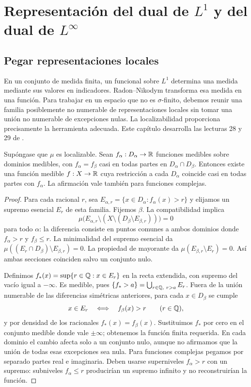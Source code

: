 \chapter{Representación del dual de \texorpdfstring{$L^1$}{L1} y del dual de \texorpdfstring{$L^\infty$}{L infinito}}\label{v2:cap14}\label{cap:v2-14}
\section{Pegar representaciones locales}\label{lectura:v2-28}
En un conjunto de medida finita, un funcional sobre $L^1$ determina una medida mediante sus valores en indicadores. Radon--Nikodym transforma esa medida en una función. Para trabajar en un espacio que no es $\sigma$-finito, debemos reunir una familia posiblemente no numerable de representaciones locales sin tomar una unión no numerable de excepciones nulas. La localizabilidad proporciona precisamente la herramienta adecuada. Este capítulo desarrolla las lecturas 28 y 29 de \cite{valencia2}.
\begin{lema}\label{v2:pegado-medible}
Supóngase que $\mu$ es localizable. Sean $f_\alpha:D_\alpha\to\mathbb R$ funciones medibles sobre dominios medibles, con $f_\alpha=f_\beta$ casi en todas partes en $D_\alpha\cap D_\beta$. Entonces existe una función medible $f:X\to\mathbb R$ cuya restricción a cada $D_\alpha$ coincide casi en todas partes con $f_\alpha$. La afirmación vale también para funciones complejas.
\end{lema}
\begin{proof}
Para cada racional $r$, sea $E_{\alpha,r}=\{x\in D_\alpha:f_\alpha(x)>r\}$ y elijamos un supremo esencial $E_r$ de esta familia. Fijemos $\beta$. La compatibilidad implica
\[
 \mu\bigl(E_{\alpha,r}\setminus(X\setminus(D_\beta\setminus E_{\beta,r}))\bigr)=0
\]
para todo $\alpha$: la diferencia consiste en puntos comunes a ambos dominios donde $f_\alpha>r$ y $f_\beta\le r$. La minimalidad del supremo esencial da $\mu((E_r\cap D_\beta)\setminus E_{\beta,r})=0$. La propiedad de mayorante da $\mu(E_{\beta,r}\setminus E_r)=0$. Así ambas secciones coinciden salvo un conjunto nulo.

Definimos $f_*(x)=\sup\{r\in\mathbb Q:x\in E_r\}$ en la recta extendida, con supremo del vacío igual a $-\infty$. Es medible, pues $\{f_*>a\}=\bigcup_{r\in\mathbb Q,\ r>a}E_r$. Fuera de la unión numerable de las diferencias simétricas anteriores, para cada $x\in D_\beta$ se cumple
\[
 x\in E_r\quad\Longleftrightarrow\quad f_\beta(x)>r\qquad(r\in\mathbb Q),
\]
y por densidad de los racionales $f_*(x)=f_\beta(x)$. Sustituimos $f_*$ por cero en el conjunto medible donde vale $\pm\infty$; obtenemos la función finita requerida. En cada dominio el cambio afecta solo a un conjunto nulo, aunque no afirmamos que la unión de todas esas excepciones sea nula. Para funciones complejas pegamos por separado partes real e imaginaria. Deben usarse superniveles $f_\alpha>r$ con un supremo: subniveles $f_\alpha\le r$ producirían un supremo infinito y no reconstruirían la función.
\end{proof}
